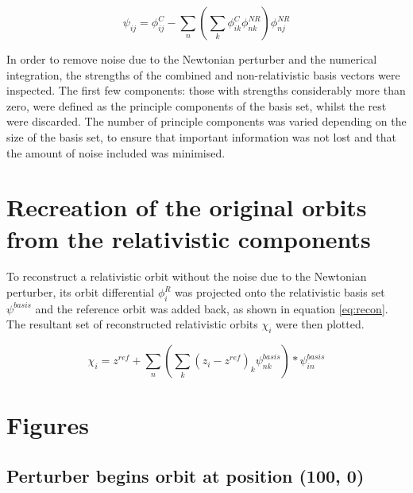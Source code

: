 \documentclass[11pt,a4paper]{article}
\begin{document}

\begin{equation}\label{eq:proj}
\psi_{ij} = \phi^{C}_{ij} - \sum\limits_{n} (\sum\limits_{k} \phi^C_{ik} \phi^{NR}_{nk}) \phi^{NR}_{nj}
\end{equation}

In order to remove noise due to the Newtonian perturber and the numerical integration, the strengths of the combined and non-relativistic basis vectors were inspected. The first few components: those with strengths considerably more than zero, were defined as the principle components of the basis set, whilst the rest were discarded. The number of principle components was varied depending on the size of the basis set, to ensure that important information was not lost and that the amount of noise included was minimised.

\section{Recreation of the original orbits from the relativistic components}

To reconstruct a relativistic orbit without the noise due to the Newtonian perturber, its orbit differential $\phi^R_i$ was projected onto the relativistic basis set $\psi^{basis}$ and the reference orbit was added back, as shown in equation \ref{eq:recon}. The resultant set of reconstructed relativistic orbits $\chi_{i}$ were then plotted.

\begin{equation}\label{eq:recon}
\chi_{i} = z^{ref} + \sum\limits_{n} (\sum\limits_{k} (z_{i} - z^{ref})_{k} \psi^{basis}_{nk})*\psi^{basis}_{in}
\end{equation}

\newpage
\section{Figures}

\subsection{Perturber begins orbit at position (100, 0)}
\end{document}

